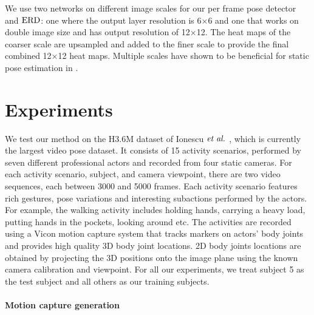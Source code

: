\documentclass[10pt,twocolumn,letterpaper]{article}
\begin{document}
We use two  networks on different image scales for our per frame pose detector and $\text{ERD}$: one where the output layer  resolution is 6$\times$6 and one that works on double  image size and has output resolution of 12$\times$12. The  heat maps of the coarser scale are upsampled and added to the finer scale to provide the final combined 12$\times$12 heat maps. Multiple scales have shown to be beneficial  for static pose estimation  in \cite{vpsKpsTulsianiM14,DBLP:conf/nips/TompsonJLB14,DBLP:journals/corr/ToshevS13}.
  
  








    

\section{Experiments}
We test our method on the H3.6M dataset of Ionescu $\text{\textit{et al.}}$ \cite{h36m_pami}, which is currently the largest video pose dataset. It consists of 15  activity scenarios, performed by seven  different professional  actors and  recorded from four static cameras. For each activity scenario, subject, and camera viewpoint, there are two video sequences, each  between 3000 and 5000 frames. Each activity scenario features rich gestures, pose variations and interesting subactions  performed by the actors. For example, the walking activity includes holding hands, carrying a heavy load, putting hands in the pockets,  looking around etc. The activities are recorded using a Vicon motion capture system that tracks markers on actors' body joints and provides  high quality 3D body joint locations. 
2D body joints locations are obtained by projecting the 3D positions onto the image plane using the  known camera calibration and viewpoint. For all our experiments, we treat subject 5 as the test subject and all others as our training subjects. 


 
 


\paragraph{Motion capture generation}
\end{document}
